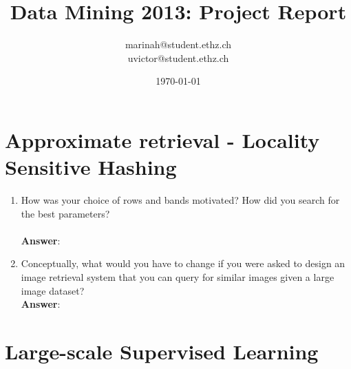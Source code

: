 \documentclass[11pt]{article}
\title{Data Mining 2013: Project Report}
\author{marinah@student.ethz.ch\\ uvictor@student.ethz.ch\\}
\date{\today}
\begin{document}
\maketitle

\section{Approximate retrieval - Locality Sensitive Hashing}
\begin{enumerate}
\item How was your choice of rows and bands motivated? How did you search for the
best parameters? \\ \\
\textbf{Answer}:

\item Conceptually, what would you have to change if you were asked to design an image
  retrieval system that you can query for similar images given a large image
  dataset? \\

\textbf{Answer}:

\end{enumerate}

\section{Large-scale Supervised Learning}
\end{document}
